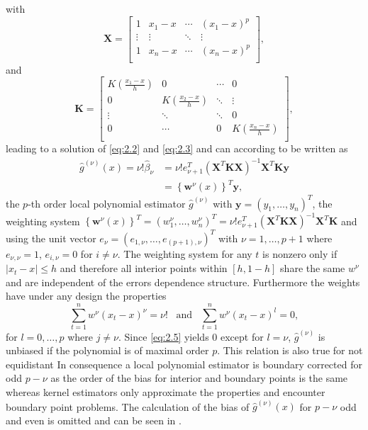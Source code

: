 \documentclass[12pt]{article}
\begin{document}
with
$$
\mathbf{X} = \begin{bmatrix}
1   & x_1 - x &   \cdots  & (x_1 - x )^{p}  \\
\vdots & \vdots  & \ddots    & \vdots          \\
1   & x_n - x & \cdots    & (x_n - x )^{p}  \\
\end{bmatrix},
$$
and 
$$
\mathbf{K} = \begin{bmatrix}
K \left( \frac{x_{1}-x}{h}\right) & 0 								   & \cdots  & 0      \\
0 								  & K \left( \frac{x_{2}-x}{h}\right)  & \ddots  & \vdots \\
\vdots 							  & \ddots        					   & \ddots  & 0      \\
0   							  & \cdots 							   & 0  	 & K \left( \frac{x_{n}-x}{h}\right) \\
\end{bmatrix},
$$
leading to a solution of \eqref{eq:2.2} and \eqref{eq:2.3} and can according to \textcite{feng2004non} be written as
\begin{equation}
\label{eq:Trend}
\begin{split}
\hat{g}^{(\nu)}(x) = \nu!\hat{\beta}_{\nu} & = \nu! e_{\nu+1}^{T} (\mathbf{X}^{T} \mathbf{KX})^{-1} \mathbf{X}^{T} \mathbf{K} \mathbf{y} \\
& = \left\lbrace \mathbf{w}^{\nu}(x) \right\rbrace^{T} \mathbf{y},
\end{split}
\end{equation}
the \(p\)-th order local polynomial estimator \(\hat{g}^{(\nu)}\) with \(\mathbf{y} = (y_{1},\ldots,y_{n})^{T}\), the weighting system \(\left\lbrace \mathbf{w}^{\nu}(x) \right\rbrace^{T} = (w_{1}^{\nu},\ldots,w_{n}^{\nu})^{T} = \nu! e_{\nu+1}^{T} 
(\mathbf{X}^{T} \mathbf{KX})^{-1} \mathbf{X}^{T} \mathbf{K}\) and
using the unit vector \(e_{\nu} = (e_{1,\nu},\ldots,e_{(p+1),\nu})^{T}\) with
\(\nu = 1,\ldots,p+1\) where \(e_{\nu,\nu} = 1\), \(e_{i,\nu} = 0\) for \(i \neq \nu\).
The weighting system for any \(t\) is nonzero only if \(|x_{t} - x| \leq h\) and therefore all interior points within \([h,1-h]\) share the same \(w^{\nu}\) and are independent of the errors dependence structure. 
Furthermore the weights have under any design the properties
\begin{equation}
\label{eq:2.5}
\sum_{t=1}^{n} w^{\nu} (x_{t} - x)^{\nu} = \nu! \,\,\,\,\, \text{and} \,\,\,\,\,  \sum_{t=1}^{n} w^{\nu} (x_{t} - x)^{l} = 0,
\end{equation}
for \(l=0,\ldots,p\) where \(j\neq\nu\). Since \eqref{eq:2.5} yields \( 0 \)  except for \(l = \nu\), \(\hat{g}^{(\nu)}\) is unbiased if the polynomial is of maximal order \(p\). This relation is also true for not equidistant 
In consequence a local polynomial estimator is boundary corrected for odd \(p - \nu\) as the order of the bias for interior and boundary points is the same whereas kernel estimators only approximate the properties and encounter boundary point problems.
The calculation of the bias of \(\hat{g}^{(\nu)}(x)\) for \(p - \nu\) odd and even is omitted and can be seen in \textcite{beran2016long}.
\end{document}
